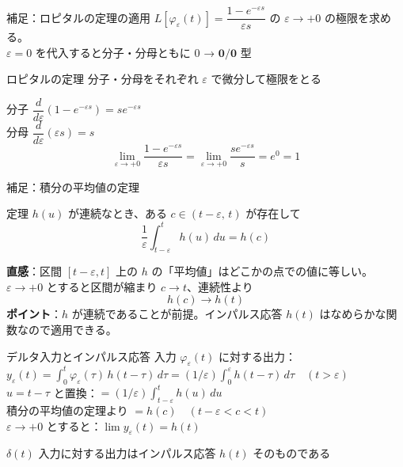 \documentclass[professionalfonts]{beamer}
\begin{document}
\begin{frame}{補足：ロピタルの定理の適用}
  $L[\varphi_\varepsilon(t)] = \dfrac{1-e^{-\varepsilon s}}{\varepsilon s}$ の $\varepsilon\to+0$ の極限を求める。\\[8pt]
  $\varepsilon=0$ を代入すると分子・分母ともに $0$ → $\boldsymbol{0/0}$ 型\\[8pt]
  \begin{block}{ロピタルの定理}
    分子・分母をそれぞれ $\varepsilon$ で微分して極限をとる
  \end{block}
  \vspace{4pt}
  分子 $\dfrac{d}{d\varepsilon}(1-e^{-\varepsilon s}) = se^{-\varepsilon s}$\\[6pt]
  分母 $\dfrac{d}{d\varepsilon}(\varepsilon s) = s$\\[8pt]
  \[
    \lim_{\varepsilon\to+0}\frac{1-e^{-\varepsilon s}}{\varepsilon s}
    = \lim_{\varepsilon\to+0}\frac{se^{-\varepsilon s}}{s}
    = e^{0} = 1
  \]
\end{frame}

\begin{frame}{補足：積分の平均値の定理}
  \begin{block}{定理}
    $h(u)$ が連続なとき、ある $c\in(t-\varepsilon,\, t)$ が存在して
    \[
      \frac{1}{\varepsilon}\int_{t-\varepsilon}^{t} h(u)\,du = h(c)
    \]
  \end{block}
  \vspace{4pt}
  \textbf{直感}：区間 $[t-\varepsilon, t]$ 上の $h$ の「平均値」はどこかの点での値に等しい。\\[8pt]
  $\varepsilon\to+0$ とすると区間が縮まり $c\to t$、連続性より
  \[
    h(c) \to h(t)
  \]
  \textbf{ポイント}：$h$ が連続であることが前提。インパルス応答 $h(t)$ はなめらかな関数なので適用できる。
\end{frame}

\begin{frame}{デルタ入力とインパルス応答}
  入力 $\varphi_\varepsilon(t)$ に対する出力：\\[4pt]
  $y_\varepsilon(t) = \int_0^t \varphi_\varepsilon(\tau)\, h(t-\tau)\, d\tau = (1/\varepsilon)\int_0^\varepsilon h(t-\tau)\, d\tau \quad (t > \varepsilon)$\\[4pt]
  $u = t-\tau$ と置換：$= (1/\varepsilon)\int_{t-\varepsilon}^t h(u)\, du$\\[4pt]
  積分の平均値の定理より $= h(c) \quad (t-\varepsilon < c < t)$\\[4pt]
  $\varepsilon \to +0$ とすると：$\lim y_\varepsilon(t) = h(t)$\\[8pt]
  \begin{alertblock}{}
  $\delta(t)$ 入力に対する出力はインパルス応答 $h(t)$ そのものである
  \end{alertblock}
\end{frame}
\end{document}
